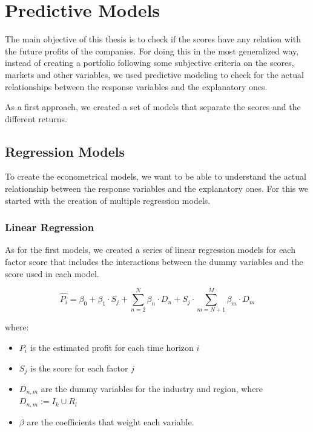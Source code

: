 \documentclass[11pt,english,a4paper,hidelinks]{book}
\begin{document}
\section{Predictive Models}
The main objective of this thesis is to check if the scores have any relation with the future profits of the companies. For doing this in the most generalized way, instead of creating a portfolio following some subjective criteria on the scores, markets and other variables, we used predictive modeling to check for the actual relationships between the response variables and the explanatory ones.

\vspace{0.5cm}
\noindent As a first approach, we created a set of models that separate the scores and the different returns. 


\subsection{Regression Models}

To create the econometrical models, we want to be able to understand the actual relationship between the response variables and the explanatory ones. For this we started with the creation of multiple regression models.

\subsubsection{Linear Regression}

As for the first models, we created a series of linear regression models for each factor score that
includes the interactions between the dummy variables and the score used in each model.

\begin{equation}
    \hat{P_i}=\beta_0+\beta_1 \cdot S_j + 
\sum_{n=2}^{N}\beta_{n}\cdot D_n + S_j \cdot \sum_{m=N+1}^{M}\beta_{m}\cdot D_m
\end{equation}

\noindent where:
\begin{itemize}
    \item \(P_i\) is the estimated profit for each time horizon \(i\)
    \item \(S_j\) is the score for each factor \(j\)
    \item \(D_{n,m}\) are the dummy variables for the industry and region, where \(D_{n,m} := I_k \cup R_l\)
    \item \(\beta\) are the coefficients that weight each variable.
\end{itemize}
\end{document}
